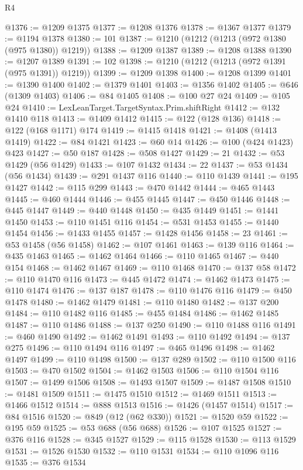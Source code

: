 \begin{lexlean}{R4}
\begin{coremodule}
@1376 := @1209 @1375
@1377 := @1208 @1376
@1378 := @1367 @1377
@1379 := @1194 @1378
@1380 := 101
@1387 := @1210 (@1212 (@1213 (@972 @1380 (@975 @1380)) @1219))
@1388 := @1209 @1387
@1389 := @1208 @1388
@1390 := @1207 @1389
@1391 := 102
@1398 := @1210 (@1212 (@1213 (@972 @1391 (@975 @1391)) @1219))
@1399 := @1209 @1398
@1400 := @1208 @1399
@1401 := @1390 @1400
@1402 := @1379 @1401
@1403 := @1356 @1402
@1405 := @646 (@1309 @1403)
@1406 := @84 @1405
@1408 := @100 @27 @24
@1409 := @105 @24
@1410 := LexLeanTarget.TargetSyntax.Prim.shiftRight
@1412 := @132 @1410 @118
@1413 := @1409 @1412
@1415 := @122 (@128 @136)
@1418 := @122 (@168 @1171) @174
@1419 := @1415 @1418
@1421 := @1408 (@1413 @1419)
@1422 := @84 @1421
@1423 := @60 @14
@1426 := @100 (@424 @1423) @423
@1427 := @50 @187
@1428 := @508 @1427
@1429 := 21
@1432 := @53 @1429 (@56 @1429)
@1433 := @107 @1432
@1434 := 22
@1437 := @53 @1434 (@56 @1434)
@1439 := @291 @1437 @116
@1440 := @110 @1439
@1441 := @195 @1427
@1442 := @115 @299
@1443 := @470 @1442
@1444 := @465 @1443
@1445 := @460 @1444
@1446 := @455 @1445
@1447 := @450 @1446
@1448 := @445 @1447
@1449 := @440 @1448
@1450 := @435 @1449
@1451 := @1441 @1450
@1453 := @110 @1451 @116
@1454 := @531 @1453
@1455 := @1440 @1454
@1456 := @1433 @1455
@1457 := @1428 @1456
@1458 := 23
@1461 := @53 @1458 (@56 @1458)
@1462 := @107 @1461
@1463 := @139 @116
@1464 := @435 @1463
@1465 := @1462 @1464
@1466 := @110 @1465
@1467 := @440 @154
@1468 := @1462 @1467
@1469 := @110 @1468
@1470 := @137 @58
@1472 := @110 @1470 @116
@1473 := @445 @1472
@1474 := @1462 @1473
@1475 := @110 @1474
@1476 := @137 @187
@1478 := @110 @1476 @116
@1479 := @450 @1478
@1480 := @1462 @1479
@1481 := @110 @1480
@1482 := @137 @200
@1484 := @110 @1482 @116
@1485 := @455 @1484
@1486 := @1462 @1485
@1487 := @110 @1486
@1488 := @137 @250
@1490 := @110 @1488 @116
@1491 := @460 @1490
@1492 := @1462 @1491
@1493 := @110 @1492
@1494 := @137 @275
@1496 := @110 @1494 @116
@1497 := @465 @1496
@1498 := @1462 @1497
@1499 := @110 @1498
@1500 := @137 @289
@1502 := @110 @1500 @116
@1503 := @470 @1502
@1504 := @1462 @1503
@1506 := @110 @1504 @116
@1507 := @1499 @1506
@1508 := @1493 @1507
@1509 := @1487 @1508
@1510 := @1481 @1509
@1511 := @1475 @1510
@1512 := @1469 @1511
@1513 := @1466 @1512
@1514 := @888 @1513
@1516 := @1426 (@1457 @1514)
@1517 := @84 @1516
@1520 := @849 (@12 (@62 @330))
@1521 := @1520 @59
@1522 := @195 @59
@1525 := @53 @688 (@56 @688)
@1526 := @107 @1525
@1527 := @376 @116
@1528 := @345 @1527
@1529 := @115 @1528
@1530 := @113 @1529
@1531 := @1526 @1530
@1532 := @110 @1531
@1534 := @110 @1096 @116
@1535 := @376 @1534

\end{coremodule}
\end{lexlean}

